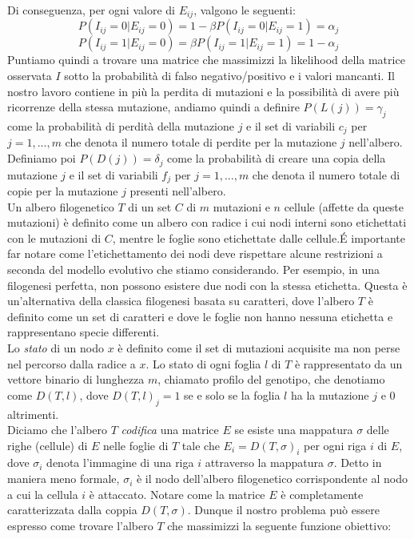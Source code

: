 \documentclass{report}
\begin{document}
  Di conseguenza, per ogni valore di ${E}_{ij}$, valgono le seguenti:
  \[
    P(I_{ij} = 0|{E}_{ij} = 0) = 1 - \beta P(I_{ij} = 0|E_{ij} = 1) = \alpha_{j}
  \]
  \[
    P(I_{ij} = 1|E_{ij} = 0) = \beta P(I_{ij} = 1|E_{ij} = 1) = 1 - \alpha_{j}
  \]
  Puntiamo quindi a trovare una matrice che massimizzi la likelihood della matrice osservata $I$ sotto la probabilità di falso negativo/positivo e i valori mancanti.
  Il nostro lavoro contiene in più la perdita di mutazioni e la possibilità di avere più ricorrenze della stessa mutazione, andiamo quindi a definire $P(L(j))={\gamma}_{j}$ come la probabilità di perdità della mutazione $j$ e il set di variabili ${c}_{j}$ per $j=1,...,m$ che denota il numero totale di perdite per la mutazione $j$ nell'albero.
  Definiamo poi $P(D(j))={\delta}_{j}$ come la probabilità di creare una copia della mutazione $j$ e il set di variabili ${f}_{j}$ per $j=1,...,m$ che denota il numero totale di copie per la mutazione $j$ presenti nell'albero.\\
  Un albero filogenetico $T$ di un set $C$ di $m$ mutazioni e $n$ cellule (affette da queste mutazioni) è definito come un albero con radice i cui nodi interni sono etichettati con le mutazioni di $C$, mentre le foglie sono etichettate dalle cellule.\;\'E importante far notare come l'etichettamento dei nodi deve rispettare alcune restrizioni a seconda del modello evolutivo che stiamo considerando. Per esempio, in una filogenesi perfetta, non possono esistere due nodi con la stessa etichetta.
  Questa è un'alternativa della classica filogenesi basata su caratteri, dove l'albero $T$ è definito come un set di caratteri e dove le foglie non hanno nessuna etichetta e rappresentano specie differenti.\\
  Lo \emph{stato} di un nodo $x$ è definito come il set di mutazioni acquisite ma non perse nel percorso dalla radice a $x$. Lo stato di ogni foglia $l$ di $T$ è rappresentato da un vettore binario di lunghezza $m$, chiamato profilo del genotipo, che denotiamo come $D(T, l)$, dove $D{(T, l)}_{j}=1$ se e solo se la foglia $l$ ha la mutazione $j$ e 0 altrimenti.\\
  Diciamo che l'albero $T$ \emph{codifica} una matrice $E$ se esiste una mappatura $\sigma$ delle righe (cellule) di $E$ nelle foglie di $T$ tale che $E_{i}=D(T, \sigma)_{i}$ per ogni riga $i$ di $E$, dove ${\sigma}_{i}$ denota l'immagine di una riga $i$ attraverso la mappatura $\sigma$.
  Detto in maniera meno formale, ${\sigma}_{i}$ è il nodo dell'albero filogenetico corrispondente al nodo a cui la cellula $i$ è attaccato. Notare come la matrice $E$ è completamente caratterizzata dalla coppia $D(T, \sigma)$. Dunque il nostro problema può essere espresso come trovare l'albero $T$ che massimizzi la seguente funzione obiettivo:
\end{document}
